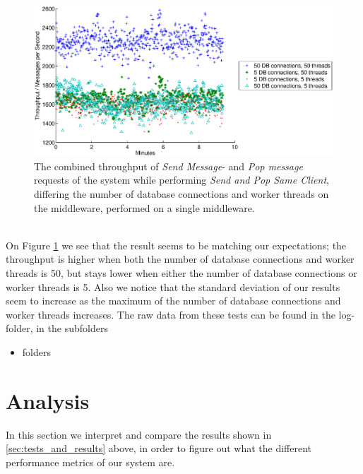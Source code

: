 \documentclass{article}
\begin{document}
             \begin{figure}[H]
                 \centering
                 \includegraphics[scale=0.50]{throughput_vs_dbconns}
                 \caption{The combined throughput of \textit{Send Message}- and \textit{Pop message} requests of the system while performing \textit{Send and Pop Same Client}, differing the number of database connections and worker threads on the middleware, performed on a single middleware.}
                 \label{fig:throughput_vs_dbconns}
             \end{figure}
             ~\\
             On Figure \ref{fig:throughput_vs_dbconns} we see that the result seems to be matching our expectations; the throughput is higher when both the number of database connections and worker threads is 50, but stays lower when either the number of database connections or worker threads is 5. Also we notice that the standard deviation of our results seem to increase as the maximum of the number of database connections and worker threads increases.
            The raw data from these tests can be found in the log-folder, in the subfolders
            \begin{itemize}
                \item folders
            \end{itemize}
            
    \section{Analysis}
        \label{sec:analysis}
        In this section we interpret and compare the results shown in \ref{sec:tests_and_results} above, in order to figure out what the different performance metrics of our system are.
\end{document}
